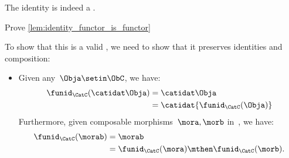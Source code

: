 \begin{lemma}
    \label{lem:identity_functor_is_functor}
    The identity  is indeed a .
\end{lemma}

\begin{exercise}
    Prove \cref{lem:identity_functor_is_functor}
\end{exercise}
\begin{solution}
    To show that this is a valid , we need to show that it preserves identities and composition:
    \begin{itemize}
        \item Given any~$\Obja \setin \ObC$, we have:
              \begin{equation}
                  \begin{aligned}
                      \funid_{\CatC}(\catidat\Obja) & =\catidat\Obja \\
                                                    & =\catidat{\funid_{\CatC}(\Obja)}
                  \end{aligned}
              \end{equation}
              Furthermore, given composable morphisms~$\mora,\morb$ in~\CatC, we have:
              \begin{equation}
                  \begin{aligned}
                      \funid_{\CatC}(\morab) & =\morab \\
                                             & =\funid_{\CatC}(\mora)\mthen \funid_{\CatC} (\morb).
                  \end{aligned}
              \end{equation}
    \end{itemize}
\end{solution}
